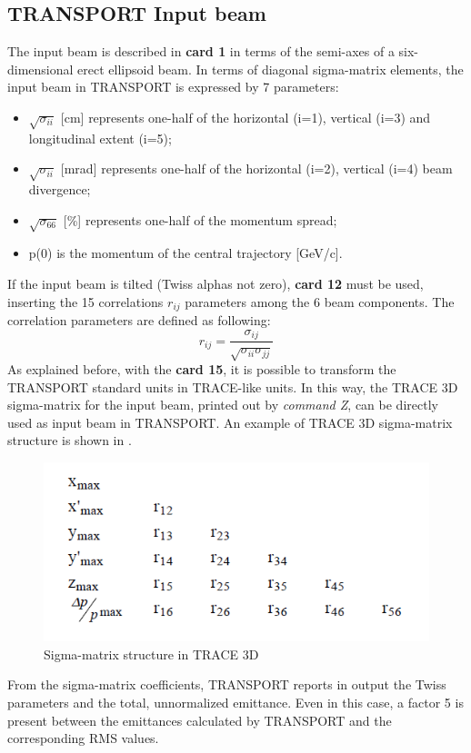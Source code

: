 \subsection{TRANSPORT Input beam}
\label{ssec:TRAN_input}
The input beam is described in \textbf{card 1} in terms of the semi-axes of a six-dimensional erect ellipsoid beam. In terms of diagonal sigma-matrix elements, the input beam in TRANSPORT is expressed by 7 parameters:
\begin{itemize}
\item $\sqrt{\sigma_{ii}}$ [cm] represents one-half of the horizontal (i=1), vertical (i=3) and longitudinal extent (i=5);
\item $\sqrt{\sigma_{ii}}$ [mrad] represents one-half of the horizontal (i=2), vertical (i=4) beam divergence;
\item $\sqrt{\sigma_{66}}$ [\%] represents one-half of the momentum spread;
\item p(0) is the momentum of the central trajectory  [GeV/c].
\end{itemize}
If the input beam is tilted (Twiss alphas not zero), \textbf{ card 12} must be used, inserting the 15 correlations $r_{ij}$ parameters among the 6 beam components. The correlation parameters are defined as following:
\begin{equation}
r_{ij}=\frac{\sigma_{ij}}{\sqrt{\sigma_{ii}\sigma_{jj}}}
\end{equation}
As explained before, with the \textbf{card 15}, it is possible to transform the TRANSPORT standard units in TRACE-like units. In this way, the TRACE 3D sigma-matrix for the input beam, printed out by \textit{command Z}, can be directly used as input beam in TRANSPORT. An example of TRACE 3D sigma-matrix structure is shown in .
\begin{figure}[!htb]
 \centering
     \includegraphics[width=0.5\textwidth-0.6cm, keepaspectratio=true]{figures/Benchmarks/TRACE_z.png}
    \caption{Sigma-matrix structure in TRACE 3D \cite{Trace_man}}
    \label{fig:trace_z}
\end{figure}
From the sigma-matrix coefficients, TRANSPORT reports in output the Twiss parameters and the total, unnormalized emittance. Even in this case, a factor 5 is present between the emittances calculated by TRANSPORT and the corresponding RMS values.
